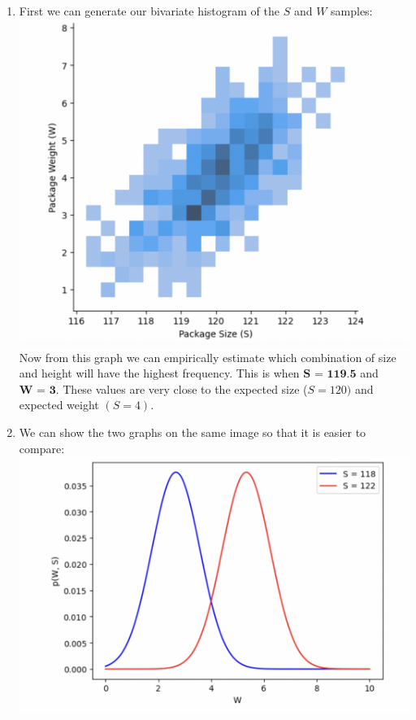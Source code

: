 \documentclass{harvardml}
\theoremstyle{definition}
\theoremstyle{plain}
\begin{document}
\begin{enumerate}
    \item 
    First we can generate our bivariate histogram of the $S$ and $W$ samples:\\
    \includegraphics[scale=0.5]{hw0/graph31.png}\\
    Now from this graph we can empirically estimate which combination of size and height will have the highest frequency. This is when $\textbf{S = 119.5}$ and $\textbf{W = 3}$. These values are very close to the expected size ($S = 120)$ and expected weight $(S=4)$.\\
    \item
    We can show the two graphs on the same image so that it is easier to compare:\\
    \includegraphics[scale=0.5]{hw0/graph32.png}\\

\end{enumerate}
\end{document}
